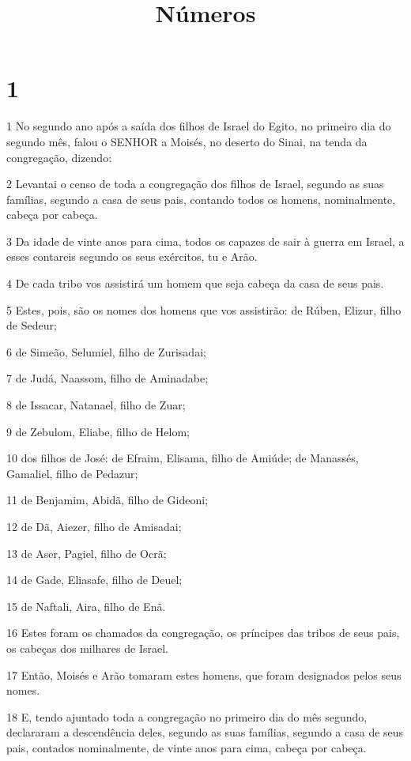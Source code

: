 

\title{Números}


\chapter{1}

\par 1 No segundo ano após a saída dos filhos de Israel do Egito, no primeiro dia do segundo mês, falou o SENHOR a Moisés, no deserto do Sinai, na tenda da congregação, dizendo:
\par 2 Levantai o censo de toda a congregação dos filhos de Israel, segundo as suas famílias, segundo a casa de seus pais, contando todos os homens, nominalmente, cabeça por cabeça.
\par 3 Da idade de vinte anos para cima, todos os capazes de sair à guerra em Israel, a esses contareis segundo os seus exércitos, tu e Arão.
\par 4 De cada tribo vos assistirá um homem que seja cabeça da casa de seus pais.
\par 5 Estes, pois, são os nomes dos homens que vos assistirão: de Rúben, Elizur, filho de Sedeur;
\par 6 de Simeão, Selumiel, filho de Zurisadai;
\par 7 de Judá, Naassom, filho de Aminadabe;
\par 8 de Issacar, Natanael, filho de Zuar;
\par 9 de Zebulom, Eliabe, filho de Helom;
\par 10 dos filhos de José: de Efraim, Elisama, filho de Amiúde; de Manassés, Gamaliel, filho de Pedazur;
\par 11 de Benjamim, Abidã, filho de Gideoni;
\par 12 de Dã, Aiezer, filho de Amisadai;
\par 13 de Aser, Pagiel, filho de Ocrã;
\par 14 de Gade, Eliasafe, filho de Deuel;
\par 15 de Naftali, Aira, filho de Enã.
\par 16 Estes foram os chamados da congregação, os príncipes das tribos de seus pais, os cabeças dos milhares de Israel.
\par 17 Então, Moisés e Arão tomaram estes homens, que foram designados pelos seus nomes.
\par 18 E, tendo ajuntado toda a congregação no primeiro dia do mês segundo, declararam a descendência deles, segundo as suas famílias, segundo a casa de seus pais, contados nominalmente, de vinte anos para cima, cabeça por cabeça.
